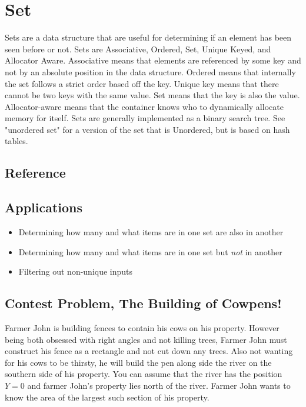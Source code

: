 \section{Set}
Sets are a data structure that are useful for determining if an element has been seen before or not.
Sets are Associative, Ordered, Set, Unique Keyed, and Allocator Aware\cite{cplusplus}.
Associative means that elements are referenced by some key and not by an absolute position in the data structure.
Ordered means that internally the set follows a strict order based off the key.
Unique key means that there cannot be two keys with the same value.
Set means that the key is also the value.
Allocator-aware means that the container knows who to dynamically allocate memory for itself.
Sets are generally implemented as a binary search tree.
See "unordered set" for a version of the set that is Unordered, but is based on hash tables.

\subsection{Reference}


\subsection{Applications}
\begin{itemize}
    \item   Determining how many and what items are in one set are also in another
    \item   Determining how many and what items are in one set but \emph{not} in another
    \item   Filtering out non-unique inputs
\end{itemize}

\subsection{Contest Problem, The Building of Cowpens!}
Farmer John is building fences to contain his cows on his property.
However being both obsessed with right angles and not killing trees, Farmer John must construct his fence as a rectangle and not cut down any trees.
Also not wanting for his cows to be thirsty, he will build the pen along side the river on the southern side of his property.
You can assume that the river has the position $Y=0$ and farmer John's property lies north of the river.
Farmer John wants to know the area of the largest such section of his property.

